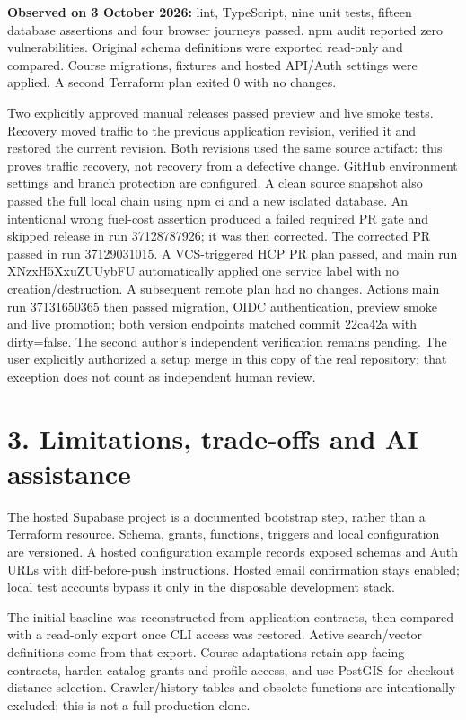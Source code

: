 \documentclass[10pt,a4paper]{article}
\begin{document}
\textbf{Observed on 3 October 2026:} lint, TypeScript, nine unit tests, fifteen database assertions and four browser journeys passed. npm audit reported zero vulnerabilities. Original schema definitions were exported read-only and compared. Course migrations, fixtures and hosted API/Auth settings were applied. A second Terraform plan exited 0 with no changes.

Two explicitly approved manual releases passed preview and live smoke tests. Recovery moved traffic to the previous application revision, verified it and restored the current revision. Both revisions used the same source artifact: this proves traffic recovery, not recovery from a defective change. GitHub environment settings and branch protection are configured. A clean source snapshot also passed the full local chain using npm ci and a new isolated database. An intentional wrong fuel-cost assertion produced a failed required PR gate and skipped release in run 37128787926; it was then corrected. The corrected PR passed in run 37129031015. A VCS-triggered HCP PR plan passed, and main run XNzxH5XxuZUUybFU automatically applied one service label with no creation/destruction. A subsequent remote plan had no changes. Actions main run 37131650365 then passed migration, OIDC authentication, preview smoke and live promotion; both version endpoints matched commit 22ca42a with dirty=false. The second author's independent verification remains pending. The user explicitly authorized a setup merge in this copy of the real repository; that exception does not count as independent human review.
\newpage
\section*{3. Limitations, trade-offs and AI assistance}
The hosted Supabase project is a documented bootstrap step, rather than a Terraform resource. Schema, grants, functions, triggers and local configuration are versioned. A hosted configuration example records exposed schemas and Auth URLs with diff-before-push instructions. Hosted email confirmation stays enabled; local test accounts bypass it only in the disposable development stack.

The initial baseline was reconstructed from application contracts, then compared with a read-only export once CLI access was restored. Active search/vector definitions come from that export. Course adaptations retain app-facing contracts, harden catalog grants and profile access, and use PostGIS for checkout distance selection. Crawler/history tables and obsolete functions are intentionally excluded; this is not a full production clone.
\end{document}
